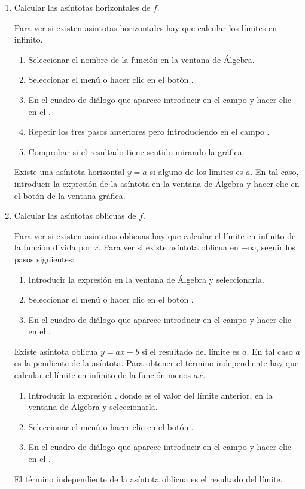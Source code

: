 \begin{enumerate}[leftmargin=*]
\begin{enumerate}
\item Calcular las asíntotas horizontales de $f$.
\begin{indicacion}
Para ver si existen asíntotas horizontales hay que calcular los límites en infinito.
\begin{enumerate}
\item Seleccionar el nombre de la función en la ventana de Álgebra.
\item Seleccionar el menú  o hacer clic en el botón .
\item En el cuadro de diálogo que aparece introducir  en el campo  y hacer clic en el . 
\item Repetir los tres pasos anteriores pero introduciendo  en el campo .
\item Comprobar si el resultado tiene sentido mirando la gráfica.
\end{enumerate}
Existe una asíntota horizontal $y=a$ si alguno de los límites es $a$.
En tal caso, introducir la expresión de la asíntota en la ventana de Álgebra y hacer clic en el botón  de la ventana gráfica.
\end{indicacion}

\item Calcular las asíntotas oblicuas de $f$.
\begin{indicacion}
Para ver si existen asíntotas oblicuas hay que calcular el límite en infinito de la función divida por $x$.
Para ver si existe asíntota oblicua en $-\infty$, seguir los pasos siguientes:
\begin{enumerate}
\item Introducir la expresión  en la ventana de Álgebra y seleccionarla.
\item Seleccionar el menú  o hacer clic en el botón .
\item En el cuadro de diálogo que aparece introducir  en el campo  y hacer clic en el . 
\end{enumerate}
Existe asíntota oblicua $y=ax+b$ si el resultado del límite es $a$.
En tal caso $a$ es la pendiente de la asíntota. 
Para obtener el término independiente hay que calcular el límite en infinito de la función menos $ax$.
\begin{enumerate}
\item Introducir la expresión , donde  es el valor del límite anterior, en la ventana de Álgebra y seleccionarla.
\item Seleccionar el menú  o hacer clic en el botón .
\item En el cuadro de diálogo que aparece introducir  en el campo  y hacer clic en el . 
\end{enumerate}
El término independiente de la asíntota oblicua es el resultado del límite. 


\end{indicacion}
\end{enumerate}
\end{enumerate}
